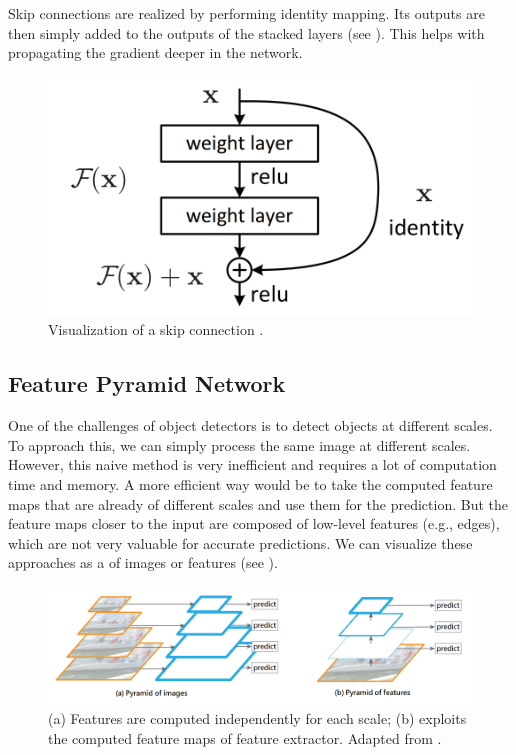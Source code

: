 Skip connections are realized by performing identity mapping. Its
outputs are then simply added to the outputs of the stacked layers (see
). This helps with propagating the gradient
deeper in the network.

\begin{figure}[h]
    \centering
    \includegraphics[width=0.4\linewidth]{Sources/Figures/residual_block.png}
    \caption{Visualization of a skip connection \cite{resnet}.}
    \label{fig:residual_block}
\end{figure}

\subsection{Feature Pyramid Network}
One of the challenges of object detectors is to detect objects at different
scales. To approach this, we can simply process the same image at different
scales. However, this naive method is very inefficient and requires a lot of
computation time and memory. A more efficient way would be to take the computed
feature maps that are already of different scales and use them for the
prediction. But the feature maps closer to the input are composed of low-level
features (e.g., edges), which are not very valuable for accurate predictions.
We can visualize these approaches as a  of images or features
(see ).

\begin{figure}[h]
    \centering
    \includegraphics[width=\linewidth]{Sources/Figures/pyramids.png}
    \caption{(a) Features are computed independently for each scale; (b)
        exploits the computed feature maps of feature extractor. Adapted from
        \cite{fpn}.}
    \label{fig:pyramids}
\end{figure}

